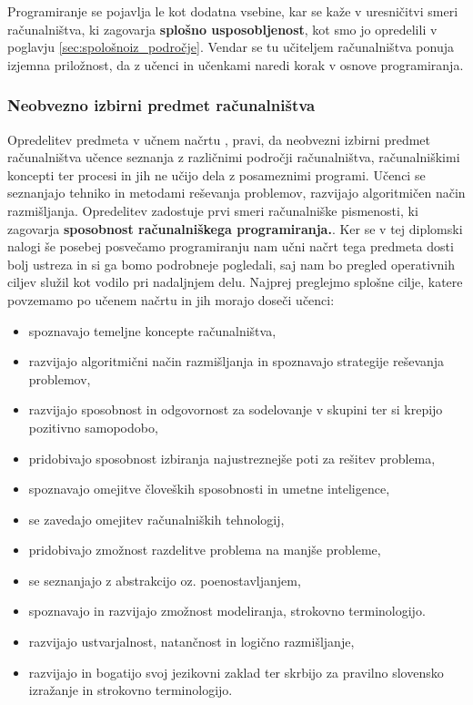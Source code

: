 Programiranje se pojavlja le kot dodatna vsebine, kar se kaže v
uresničitvi smeri računalništva, ki zagovarja \textbf{splošno
  usposobljenost}, kot smo jo opredelili v poglavju
\ref{sec:spološnoiz_področje}. Vendar se tu učiteljem računalništva
ponuja izjemna priložnost, da z učenci in učenkami naredi korak v
osnove programiranja.

\subsubsection{Neobvezno izbirni predmet računalništva}
\label{sec:neobvezno_izbirni_predmet_rac}

Opredelitev predmeta v učnem načrtu
\cite{ucni_nacrt-neobvezni-izbirni-os}, pravi, da neobvezni izbirni
predmet računalništva učence seznanja z različnimi področji
računalništva, računalniškimi koncepti ter procesi in jih ne učijo
dela z posameznimi programi. Učenci se seznanjajo tehniko in metodami
reševanja problemov, razvijajo algoritmičen način
razmišljanja. Opredelitev zadostuje prvi smeri računalniške
pismenosti, ki zagovarja \textbf{sposobnost računalniškega
  programiranja.}. Ker se v tej diplomski nalogi še posebej posvečamo
programiranju nam učni načrt tega predmeta dosti bolj ustreza in si ga
bomo podrobneje pogledali, saj nam bo pregled operativnih ciljev
služil kot vodilo pri nadaljnjem delu.  Najprej preglejmo splošne
cilje, katere povzemamo po učenem načrtu
\cite{ucni_nacrt-neobvezni-izbirni-os} in jih morajo doseči učenci:
\begin{itemize}
\tightlist
\item spoznavajo temeljne koncepte računalništva,
\item razvijajo algoritmični način razmišljanja in spoznavajo
  strategije reševanja problemov,
\item razvijajo sposobnost in odgovornost za sodelovanje v skupini ter
  si krepijo pozitivno samopodobo,
\item pridobivajo sposobnost izbiranja najustreznejše poti za rešitev
  problema,
\item  spoznavajo omejitve človeških sposobnosti in umetne
  inteligence,
\item se zavedajo omejitev računalniških tehnologij,
\item pridobivajo zmožnost razdelitve problema na manjše probleme,
\item se seznanjajo z abstrakcijo oz. poenostavljanjem,
\item spoznavajo in razvijajo zmožnost modeliranja, strokovno
  terminologijo.
\item  razvijajo ustvarjalnost, natančnost in logično razmišljanje,
\item razvijajo in bogatijo svoj jezikovni zaklad ter skrbijo za
  pravilno slovensko izražanje in strokovno terminologijo.
\end{itemize}

